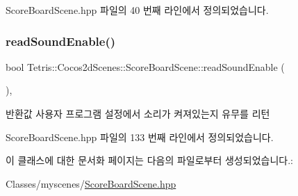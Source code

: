 Score\+Board\+Scene.\+hpp 파일의 40 번째 라인에서 정의되었습니다.

\mbox{\label{class_tetris_1_1_cocos2d_scenes_1_1_score_board_scene_a451d25787dec38631575bc240b86c897}} 
\subsubsection{\texorpdfstring{read\+Sound\+Enable()}{readSoundEnable()}}
{\footnotesize\ttfamily bool Tetris\+::\+Cocos2d\+Scenes\+::\+Score\+Board\+Scene\+::read\+Sound\+Enable (\begin{DoxyParamCaption}{ }\end{DoxyParamCaption})\hspace{0.3cm}{\ttfamily [inline]}, {\ttfamily [protected]}}

\begin{DoxyReturn}{반환값}
사용자 프로그램 설정에서 소리가 켜져있는지 유무를 리턴 
\end{DoxyReturn}


Score\+Board\+Scene.\+hpp 파일의 133 번째 라인에서 정의되었습니다.



이 클래스에 대한 문서화 페이지는 다음의 파일로부터 생성되었습니다.\+:\begin{DoxyCompactItemize}
\item 
Classes/myscenes/\hyperlink{_score_board_scene_8hpp}{Score\+Board\+Scene.\+hpp}\end{DoxyCompactItemize}
